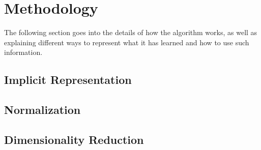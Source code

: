 \section{Methodology} \label{sect:meth}
The following section goes into the details of how the \mlblink algorithm works, as well as explaining different ways to represent what it has learned and how to use such information. 




\subsection{Implicit Representation} \label{subsect:meth:implicit}

\subsection{Normalization} \label{subsect:meth:norm}

\subsection{Dimensionality Reduction} \label{subsect:meth:dim-reduction}

